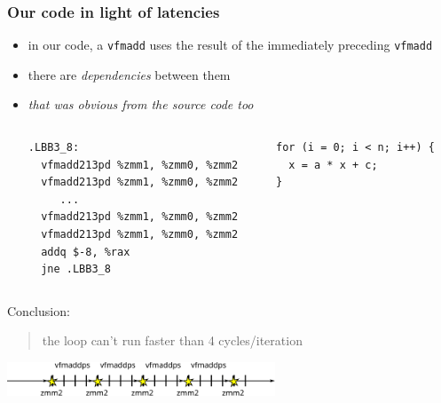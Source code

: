 \documentclass[12pt,dvipdfmx]{beamer}
\newcommand{\ao}[1]{{\color{blue}#1}}
\newcommand{\aka}[1]{{\color{red}#1}}
\begin{document}
\begin{frame}[fragile]
\frametitle{Our code in light of latencies}
\begin{itemize}
\item in our code, a \texttt{vfmadd} uses the result of 
  the immediately preceding \texttt{vfmadd}
\item there are \aka{\it dependencies} between them
\item \ao{\it that was obvious from the source code too}
\begin{columns}
\begin{column}{0.45\textwidth}
\begin{lstlisting}
.LBB3_8:
  vfmadd213pd %zmm1, %zmm0, %zmm2
  vfmadd213pd %zmm1, %zmm0, %zmm2
     ...
  vfmadd213pd %zmm1, %zmm0, %zmm2
  vfmadd213pd %zmm1, %zmm0, %zmm2
  addq $-8, %rax
  jne .LBB3_8
\end{lstlisting} %
\end{column}
\begin{column}{0.40\textwidth}
{\footnotesize
\begin{lstlisting}
for (i = 0; i < n; i++) {
  x = a * x + c;
}
\end{lstlisting}}
\end{column}
\end{columns}
\end{itemize}

Conclusion:
\begin{quote}
  \ao{the loop can't run faster than 4 cycles/iteration}
\end{quote}

\begin{center}
\includegraphics[width=0.6\textwidth]{out/pdf/svg/latency_1.pdf}
\end{center}

\end{frame}
\end{document}
